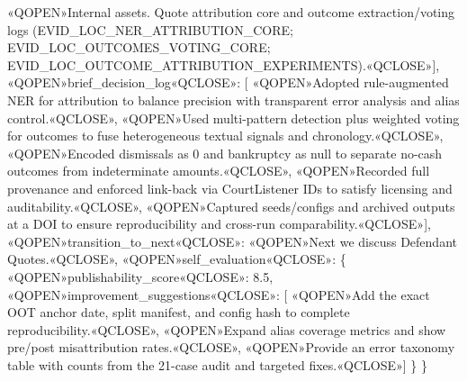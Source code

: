 «QOPEN»Internal assets. Quote attribution core and outcome extraction/voting logs (EVID\_LOC\_NER\_ATTRIBUTION\_CORE; EVID\_LOC\_OUTCOMES\_VOTING\_CORE; EVID\_LOC\_OUTCOME\_ATTRIBUTION\_EXPERIMENTS).«QCLOSE»{]},
«QOPEN»brief\_decision\_log«QCLOSE»: {[}
«QOPEN»Adopted rule-augmented NER for attribution to balance precision with transparent error analysis and alias control.«QCLOSE»,
«QOPEN»Used multi-pattern detection plus weighted voting for outcomes to fuse heterogeneous textual signals and chronology.«QCLOSE»,
«QOPEN»Encoded dismissals as 0 and bankruptcy as null to separate no-cash outcomes from indeterminate amounts.«QCLOSE»,
«QOPEN»Recorded full provenance and enforced link-back via CourtListener IDs to satisfy licensing and auditability.«QCLOSE»,
«QOPEN»Captured seeds/configs and archived outputs at a DOI to ensure reproducibility and cross-run comparability.«QCLOSE»{]},
«QOPEN»transition\_to\_next«QCLOSE»: «QOPEN»Next we discuss Defendant Quotes.«QCLOSE»,
«QOPEN»self\_evaluation«QCLOSE»: \{
«QOPEN»publishability\_score«QCLOSE»: 8.5,
«QOPEN»improvement\_suggestions«QCLOSE»: {[}
«QOPEN»Add the exact OOT anchor date, split manifest, and config hash to complete reproducibility.«QCLOSE»,
«QOPEN»Expand alias coverage metrics and show pre/post misattribution rates.«QCLOSE»,
«QOPEN»Provide an error taxonomy table with counts from the 21-case audit and targeted fixes.«QCLOSE»{]}
\}
\}
